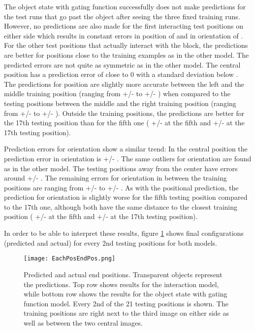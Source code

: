 The object state with gating function successfully does not make predictions for the test runs that go past the object after seeing the three fixed training runs. However, no predictions are also made for the first interacting test positions on either side which results in constant errors in position of  and in orientation of .
For the other test positions that actually interact with the block, the predictions are better for positions close to the training examples as in the other model.
The predicted errors are not quite as symmetric as in the other model.
The central position has a prediction error of close to 0 with a standard deviation below . 
The predictions for position are slightly more accurate between the left and the middle training position (ranging from  +/-  to  +/- ) when compared to the testing positions between the middle and the right training position (ranging from  +/-  to  +/- ). Outside the training positions, the predictions are better for the 17th testing position than for the fifth one ( +/-  at the fifth and  +/-  at the 17th testing position).

Prediction errors for orientation show a similar trend: 
In the central position the prediction error in orientation is  +/- .
The same outliers for orientation are found as in the other model. The testing positions  away from the center have errors around  +/- .
The remaining errors for orientation in between the training positions are ranging from  +/-  to  +/- .
As with the positional prediction, the prediction for orientation is slightly worse for the fifth testing position compared to the 17th one, although both have the same distance to the closest training position ( +/-  at the fifth and  +/-  at the 17th testing position).

In order to be able to interpret these results, figure \ref{fig:EachPosEndPos} shows final configurations (predicted and actual) for every 2nd testing positions for both models.

\begin{figure}
\centering
\texttt{[image: EachPosEndPos.png]}
\caption{Predicted and actual end positions. Transparent objects represent the predictions. Top row shows results for the interaction model, while bottom row shows the results for the object state with gating function model. Every 2nd of the 21 testing positions is shown. The training positions are right next to the third image on either side as well as between the two central images.}
\label{fig:EachPosEndPos}
\end{figure}

